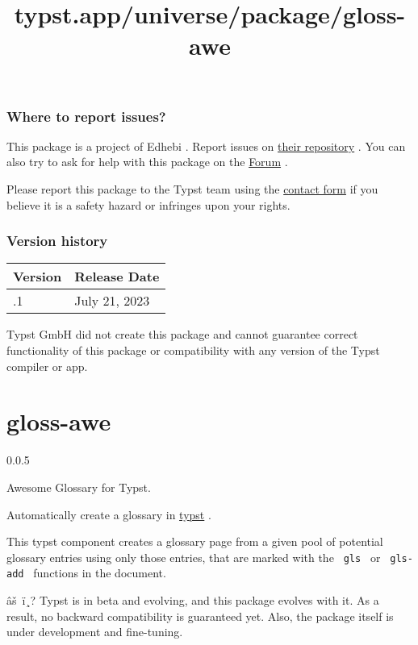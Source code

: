 \subsubsection{Where to report issues?}\label{where-to-report-issues}

This package is a project of Edhebi . Report issues on
\href{https://github.com/edhebi/numberingx}{their repository} . You can
also try to ask for help with this package on the
\href{https://forum.typst.app}{Forum} .

Please report this package to the Typst team using the
\href{https://typst.app/contact}{contact form} if you believe it is a
safety hazard or infringes upon your rights.

\label{versions}
\subsubsection{Version history}\label{version-history}

\begin{longtable}[]{@{}ll@{}}
\toprule\noalign{}
Version & Release Date \\
\midrule\noalign{}
\endhead
\bottomrule\noalign{}
\endlastfoot
0.0.1 & July 21, 2023 \\
\end{longtable}

Typst GmbH did not create this package and cannot guarantee correct
functionality of this package or compatibility with any version of the
Typst compiler or app.


\title{typst.app/universe/package/gloss-awe}

\label{banner}
\section{gloss-awe}\label{gloss-awe}

{ 0.0.5 }

Awesome Glossary for Typst.

\label{readme}
Automatically create a glossary in \href{https://typst.app/}{typst} .

This typst component creates a glossary page from a given pool of
potential glossary entries using only those entries, that are marked
with the \texttt{\ gls\ } or \texttt{\ gls-add\ } functions in the
document.

âš~ï¸? Typst is in beta and evolving, and this package evolves with it.
As a result, no backward compatibility is guaranteed yet. Also, the
package itself is under development and fine-tuning.

